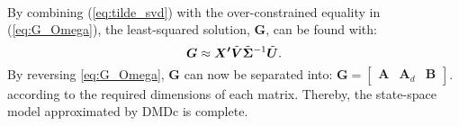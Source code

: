     \paragraph{}
    By combining (\ref{eq:tilde_svd}) with the over-constrained equality in (\ref{eq:G_Omega}), 
    the least-squared solution, $\bm{G}$, can be found with:
    \begin{equation}
        \bm{G} \approx \bm{X^\prime} \Tilde{\bm{V}} \Tilde{\bm{\Sigma}}^{-1} \Tilde{\bm{U}} .
    \end{equation}
    By reversing \ref{eq:G_Omega}, $\bm{G}$ can now be separated into:
    \(
        \bm{G} = \begin{bmatrix} \bm{A} & \bm{A}_d & \bm{B} \end{bmatrix}.
    \)
    according to the required dimensions of each matrix.
    Thereby, the state-space model approximated by DMDc is complete.
    
